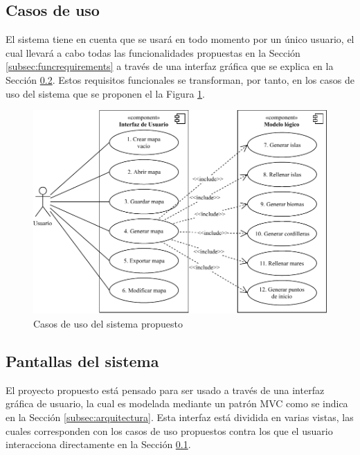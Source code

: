 \subsection{Casos de uso}
\label{subsec:cases}

El sistema tiene en cuenta que se usará en todo momento por un único usuario, el cual llevará a cabo todas las funcionalidades propuestas en la Sección \ref{subsec:funcrequirements} a través de una interfaz gráfica que se explica en la Sección \ref{subsec:mockups}. Estos requisitos funcionales se transforman, por tanto, en los casos de uso del sistema que se proponen el la Figura \ref{fig:cases}.

\begin{figure}[!h]
	\centering
	\includegraphics[width=\textwidth]{images/casos-de-uso.pdf}
	\caption{Casos de uso del sistema propuesto}
	\label{fig:cases}
\end{figure}

\subsection{Pantallas del sistema}
\label{subsec:mockups}

El proyecto propuesto está pensado para ser usado a través de una interfaz gráfica de usuario, la cual es modelada mediante un patrón MVC como se indica en la Sección \ref{subsec:arquitectura}. Esta interfaz está dividida en varias vistas, las cuales corresponden con los casos de uso propuestos contra los que el usuario interacciona directamente en la Sección \ref{subsec:cases}.

